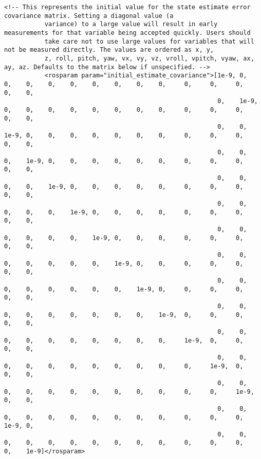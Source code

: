 \begin{lstlisting}[breaklines=true,basicstyle=\tiny]
      <!-- This represents the initial value for the state estimate error covariance matrix. Setting a diagonal value (a
           variance) to a large value will result in early measurements for that variable being accepted quickly. Users should
           take care not to use large values for variables that will not be measured directly. The values are ordered as x, y,
           z, roll, pitch, yaw, vx, vy, vz, vroll, vpitch, vyaw, ax, ay, az. Defaults to the matrix below if unspecified. -->
           <rosparam param="initial_estimate_covariance">[1e-9, 0,    0,    0,    0,    0,    0,    0,    0,    0,     0,     0,     0,    0,    0,
                                                          0,    1e-9, 0,    0,    0,    0,    0,    0,    0,    0,     0,     0,     0,    0,    0,
                                                          0,    0,    1e-9, 0,    0,    0,    0,    0,    0,    0,     0,     0,     0,    0,    0,
                                                          0,    0,    0,    1e-9, 0,    0,    0,    0,    0,    0,     0,     0,     0,    0,    0,
                                                          0,    0,    0,    0,    1e-9, 0,    0,    0,    0,    0,     0,     0,     0,    0,    0,
                                                          0,    0,    0,    0,    0,    1e-9, 0,    0,    0,    0,     0,     0,     0,    0,    0,
                                                          0,    0,    0,    0,    0,    0,    1e-9, 0,    0,    0,     0,     0,     0,    0,    0,
                                                          0,    0,    0,    0,    0,    0,    0,    1e-9, 0,    0,     0,     0,     0,    0,    0,
                                                          0,    0,    0,    0,    0,    0,    0,    0,    1e-9, 0,     0,     0,     0,    0,    0,
                                                          0,    0,    0,    0,    0,    0,    0,    0,    0,    1e-9,  0,     0,     0,    0,    0,
                                                          0,    0,    0,    0,    0,    0,    0,    0,    0,    0,     1e-9,  0,     0,    0,    0,
                                                          0,    0,    0,    0,    0,    0,    0,    0,    0,    0,     0,     1e-9,  0,    0,    0,
                                                          0,    0,    0,    0,    0,    0,    0,    0,    0,    0,     0,     0,     1e-9, 0,    0,
                                                          0,    0,    0,    0,    0,    0,    0,    0,    0,    0,     0,     0,     0,    1e-9, 0,
                                                          0,    0,    0,    0,    0,    0,    0,    0,    0,    0,     0,     0,     0,    0,    1e-9]</rosparam>



\end{lstlisting}
